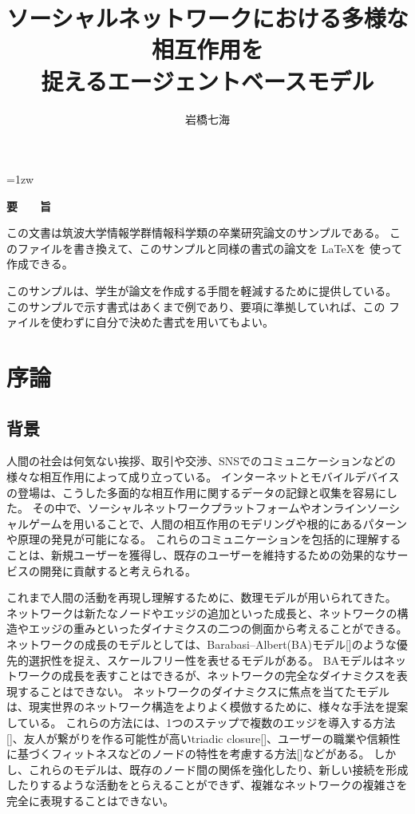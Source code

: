 \documentclass[uplatex,11pt,openany]{ujreport}
\title{ソーシャルネットワークにおける多様な相互作用を\\捉えるエージェントベースモデル}
\author{岩橋七海}
\begin{document}
\maketitle
\thispagestyle{empty}
\newpage

\thispagestyle{empty}
\vspace*{20pt plus 1fil}
\parindent=1zw
\noindent
\begin{center}
{\Large \bf 要　　旨}
\vspace{2cm}
\end{center}
この文書は筑波大学情報学群情報科学類の卒業研究論文のサンプルである。
このファイルを書き換えて、このサンプルと同様の書式の論文を \LaTeX を
使って作成できる。

このサンプルは、学生が論文を作成する手間を軽減するために提供している。
このサンプルで示す書式はあくまで例であり、要項に準拠していれば、この
ファイルを使わずに自分で決めた書式を用いてもよい。

\par
\vspace{0pt plus 1fil}
\newpage

\tableofcontents
\listoffigures

\pagebreak \setcounter{page}{1}

\chapter{序論}
    \section{背景}
    人間の社会は何気ない挨拶、取引や交渉、SNSでのコミュニケーションなどの様々な相互作用によって成り立っている。
    インターネットとモバイルデバイスの登場は、こうした多面的な相互作用に関するデータの記録と収集を容易にした。
    その中で、ソーシャルネットワークプラットフォームやオンラインソーシャルゲームを用いることで、人間の相互作用のモデリングや根的にあるパターンや原理の発見が可能になる。
    これらのコミュニケーションを包括的に理解することは、新規ユーザーを獲得し、既存のユーザーを維持するための効果的なサービスの開発に貢献すると考えられる。

    これまで人間の活動を再現し理解するために、数理モデルが用いられてきた。
    ネットワークは新たなノードやエッジの追加といった成長と、ネットワークの構造やエッジの重みといったダイナミクスの二つの側面から考えることができる。
    ネットワークの成長のモデルとしては、Barabasi--Albert(BA)モデル[]のような優先的選択性を捉え、スケールフリー性を表せるモデルがある。
    BAモデルはネットワークの成長を表すことはできるが、ネットワークの完全なダイナミクスを表現することはできない。
    ネットワークのダイナミクスに焦点を当てたモデルは、現実世界のネットワーク構造をよりよく模倣するために、様々な手法を提案している。
    これらの方法には、1つのステップで複数のエッジを導入する方法[]、友人が繋がりを作る可能性が高いtriadic closure[]、ユーザーの職業や信頼性に基づくフィットネスなどのノードの特性を考慮する方法[]などがある。
    しかし、これらのモデルは、既存のノード間の関係を強化したり、新しい接続を形成したりするような活動をとらえることができず、複雑なネットワークの複雑さを完全に表現することはできない。
\end{document}
